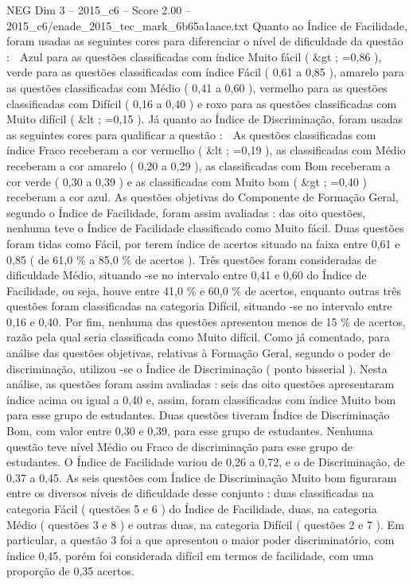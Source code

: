 \begin{textsample}{NEG Dim 3 – 2015\_c6 – Score 2.00 – 2015\_c6/enade\_2015\_tec\_mark\_6b65a1aace.txt}
Quanto ao Índice de Facilidade, foram usadas as seguintes cores para diferenciar o nível de dificuldade da questão :  Azul para as questões classificadas com índice Muito fácil ( \&gt ; =0,86 ), verde para as questões classificadas com índice Fácil ( 0,61 a 0,85 ), amarelo para as questões classificadas com Médio ( 0,41 a 0,60 ), vermelho para as questões classificadas com Difícil ( 0,16 a 0,40 ) e roxo para as questões classificadas com Muito difícil ( \&lt ; =0,15 ).
Já quanto ao Índice de Discriminação, foram usadas as seguintes cores para qualificar a questão :  As questões classificadas com índice Fraco receberam a cor vermelho ( \&lt ; =0,19 ), as classificadas com Médio receberam a cor amarelo ( 0,20 a 0,29 ), as classificadas com Bom receberam a cor verde ( 0,30 a 0,39 ) e as classificadas com Muito bom ( \&gt ; =0,40 ) receberam a cor azul.
As questões objetivas do Componente de Formação Geral, segundo o Índice de Facilidade, foram assim avaliadas : das oito questões, nenhuma teve o Índice de Facilidade classificado como Muito fácil.
Duas questões foram tidas como Fácil, por terem índice de acertos situado na faixa entre 0,61 e 0,85 ( de 61,0 \% a 85,0 \% de acertos ).
Três questões foram consideradas de dificuldade Médio, situando -se no intervalo entre 0,41 e 0,60 do Índice de Facilidade, ou seja, houve entre 41,0 \% e 60,0 \% de acertos, enquanto outras três questões foram classificadas na categoria Difícil, situando -se no intervalo entre 0,16 e 0,40.
Por fim, nenhuma das questões apresentou menos de 15 \% de acertos, razão pela qual seria classificada como Muito difícil.
Como já comentado, para análise das questões objetivas, relativas à Formação Geral, segundo o poder de discriminação, utilizou -se o Índice de Discriminação ( ponto bisserial ).
Nesta análise, as questões foram assim avaliadas : seis das oito questões apresentaram índice acima ou igual a 0,40 e, assim, foram classificadas com índice Muito bom para esse grupo de estudantes.
Duas questões tiveram Índice de Discriminação Bom, com valor entre 0,30 e 0,39, para esse grupo de estudantes.
Nenhuma questão teve nível Médio ou Fraco de discriminação para esse grupo de estudantes.
O Índice de Facilidade variou de 0,26 a 0,72, e o de Discriminação, de 0,37 a 0,45.
As seis questões com Índice de Discriminação Muito bom figuraram entre os diversos níveis de dificuldade desse conjunto : duas classificadas na categoria Fácil ( questões 5 e 6 ) do Índice de Facilidade, duas, na categoria Médio ( questões 3 e 8 ) e outras duas, na categoria Difícil ( questões 2 e 7 ).
Em particular, a questão 3 foi a que apresentou o maior poder discriminatório, com índice 0,45, porém foi considerada difícil em termos de facilidade, com uma proporção de 0,35 acertos.

\end{textsample}

